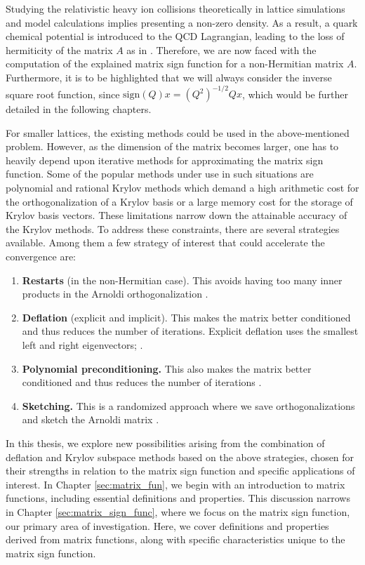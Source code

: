 Studying the relativistic heavy ion collisions theoretically in lattice simulations and model calculations implies presenting a non-zero density. As a result, a quark chemical potential is introduced to the QCD Lagrangian, leading to the loss of hermiticity of the matrix $A$ as in \cite{16}. Therefore, we are now faced with the computation of the explained matrix sign function for a non-Hermitian matrix $A$. Furthermore, it is to be highlighted that we will always consider the inverse square root function, since $\text{sign}(Q)x = (Q^2)^{-1/2}Qx$, which would be further detailed in the following chapters.

For smaller lattices, the existing methods could be used in the above-mentioned problem. However, as the dimension of the matrix becomes larger, one has to heavily depend upon iterative methods for approximating the matrix sign function. Some of the popular methods under use in such situations are polynomial \cite{17,18} and rational \cite{19,20,21} Krylov methods which demand a high arithmetic cost for the orthogonalization of a Krylov basis or a large memory cost for the storage of Krylov basis vectors. These limitations narrow down the attainable accuracy of the Krylov methods. To address these constraints, there are several strategies available. Among them a few strategy of interest that could accelerate the convergence are:
\begin{enumerate}
    \item \textbf{Restarts} (in the non-Hermitian case). This avoids having too many inner products in the Arnoldi orthogonalization \cite{52}.
    \item \textbf{Deflation} (explicit and implicit). This makes the matrix better conditioned and thus reduces the number of iterations. Explicit deflation uses the smallest left and right eigenvectors; \cite{52, 11}.
    \item \textbf{Polynomial preconditioning.} This also makes the matrix better conditioned and thus reduces the number of iterations \cite{49}.
    \item \textbf{Sketching.} This is a randomized approach where we save orthogonalizations and sketch the Arnoldi matrix \cite{41}.
\end{enumerate}

In this thesis, we explore new possibilities arising from the combination of deflation and Krylov subspace methods based on the above strategies, chosen for their strengths in relation to the matrix sign function and specific applications of interest. In Chapter \ref{sec:matrix_fun}, we begin with an introduction to matrix functions, including essential definitions and properties. This discussion narrows in Chapter \ref{sec:matrix_sign_func}, where we focus on the matrix sign function, our primary area of investigation. Here, we cover definitions and properties derived from matrix functions, along with specific characteristics unique to the matrix sign function.

